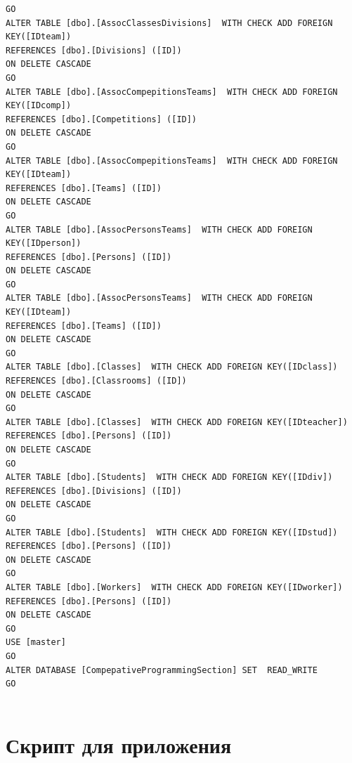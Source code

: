 \documentclass[a4paper,12pt,preview]{report} %
\begin{document}
\begin{verbatim}
GO
ALTER TABLE [dbo].[AssocClassesDivisions]  WITH CHECK ADD FOREIGN KEY([IDteam])
REFERENCES [dbo].[Divisions] ([ID])
ON DELETE CASCADE
GO
ALTER TABLE [dbo].[AssocCompepitionsTeams]  WITH CHECK ADD FOREIGN KEY([IDcomp])
REFERENCES [dbo].[Competitions] ([ID])
ON DELETE CASCADE
GO
ALTER TABLE [dbo].[AssocCompepitionsTeams]  WITH CHECK ADD FOREIGN KEY([IDteam])
REFERENCES [dbo].[Teams] ([ID])
ON DELETE CASCADE
GO
ALTER TABLE [dbo].[AssocPersonsTeams]  WITH CHECK ADD FOREIGN KEY([IDperson])
REFERENCES [dbo].[Persons] ([ID])
ON DELETE CASCADE
GO
ALTER TABLE [dbo].[AssocPersonsTeams]  WITH CHECK ADD FOREIGN KEY([IDteam])
REFERENCES [dbo].[Teams] ([ID])
ON DELETE CASCADE
GO
ALTER TABLE [dbo].[Classes]  WITH CHECK ADD FOREIGN KEY([IDclass])
REFERENCES [dbo].[Classrooms] ([ID])
ON DELETE CASCADE
GO
ALTER TABLE [dbo].[Classes]  WITH CHECK ADD FOREIGN KEY([IDteacher])
REFERENCES [dbo].[Persons] ([ID])
ON DELETE CASCADE
GO
ALTER TABLE [dbo].[Students]  WITH CHECK ADD FOREIGN KEY([IDdiv])
REFERENCES [dbo].[Divisions] ([ID])
ON DELETE CASCADE
GO
ALTER TABLE [dbo].[Students]  WITH CHECK ADD FOREIGN KEY([IDstud])
REFERENCES [dbo].[Persons] ([ID])
ON DELETE CASCADE
GO
ALTER TABLE [dbo].[Workers]  WITH CHECK ADD FOREIGN KEY([IDworker])
REFERENCES [dbo].[Persons] ([ID])
ON DELETE CASCADE
GO
USE [master]
GO
ALTER DATABASE [CompepativeProgrammingSection] SET  READ_WRITE 
GO


	\end{verbatim}
	
	\section{Скрипт для приложения}
	
\end{document}
